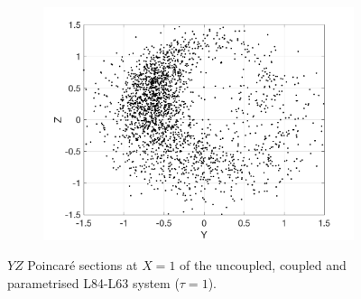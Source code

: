 \documentclass[12pt]{article}
\begin{document}
\begin{figure}[H]
\begin{subfigure}[b]{0.3\textwidth}
		\includegraphics[width=\textwidth]{plots/l84l63/poincare_yz_p.png}
	\end{subfigure}
	\caption{\label{poincareyz}$YZ$ Poincar\'e sections at $X=1$ of the uncoupled, coupled and parametrised L84-L63 system ($\tau=1$).}
\end{figure}
\end{document}
